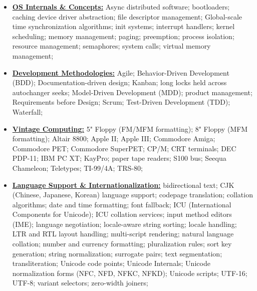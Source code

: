 \documentclass[letterpaper,11pt]{article}
\begin{document}
{\begin{itemize}[leftmargin=0.1in, label={}, itemsep=0pt, parsep=0pt, topsep=0pt, partopsep=0pt]
\item
    \textbf{\underline{OS Internals \& Concepts:}} \hspace{0pt}
    Async distributed software;
    bootloaders;
    caching
    device driver abstraction;
    file descriptor management;
    Global-scale time synchronization algorithms;
    init systems;
    interrupt handlers;
    kernel scheduling;
    memory management;
    paging;
    preemption;
    process isolation;
    resource management;
    semaphores;
    system calls;
    virtual memory management;

\item
    \textbf{\underline{Development Methodologies:}} \hspace{0pt}
    Agile;
    Behavior-Driven Development (BDD);
    Documentation-driven design;
    Kanban;
    long locks held across autochanger seeks;
    Model-Driven Development (MDD);
    product management;
    Requirements before Design;
    Scrum;
    Test-Driven Development (TDD);
    Waterfall;

\item
    \textbf{\underline{Vintage Computing:}} \hspace{0pt}
    5" Floppy (FM/MFM formatting);
    8" Floppy (MFM formatting);
    Altair 8800;
    Apple II;
    Apple III;
    Commodore Amiga;
    Commodore PET;
    Commodore SuperPET;
    CP/M;
    CRT terminals;
    DEC PDP-11;
    IBM PC XT;
    KayPro;
    paper tape readers;
    S100 bus;
    Seequa Chameleon;
    Teletypes;
    TI-99/4A;
    TRS-80;

\item
    \textbf{\underline{Language Support \& Internationalization:}} \hspace{0pt}
    bidirectional text;
    CJK (Chinese, Japanese, Korean) language support;
    codepage translation;
    collation algorithms;
    date and time formatting;
    font fallback;
    ICU (International Components for Unicode);
    ICU collation services;
    input method editors (IME);
    language negotiation;
    locale-aware string sorting;
    locale handling;
    LTR and RTL layout handling;
    multi-script rendering;
    natural language collation;
    number and currency formatting;
    pluralization rules;
    sort key generation;
    string normalization;
    surrogate pairs;
    text segmentation;
    transliteration;
    Unicode code points;
    Unicode Internals;
    Unicode normalization forms (NFC, NFD, NFKC, NFKD);
    Unicode scripts;
    UTF-16;
    UTF-8;
    variant selectors;
    zero-width joiners;


\end{itemize}}
\end{document}
